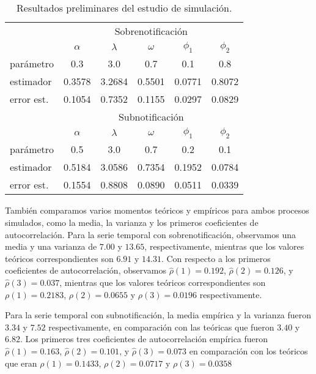 \documentclass[12pt,twoside]{article} %
\begin{document}
\begin{table}[ht]\small
\begin{center}
\caption{Resultados preliminares del estudio de simulación.\label{tab1}}
\begin{tabular}{lccccc}
\hline
& \multicolumn{5}{c}{Sobrenotificación}\\
& $\alpha$&$\lambda$&$\omega$&$\phi_1$&$\phi_2$\\
 \hline
parámetro & 0.3 & 3.0 & 0.7& 0.1& 0.8\\
estimador & 0.3578 & 3.2684 & 0.5501 & 0.0771 &0.8072 \\
error est. &  0.1054 & 0.7352 & 0.1155 & 0.0297 & 0.0829 \\
\hline \hline 
& \multicolumn{5}{c}{Subnotificación}\\
& $\alpha$&$\lambda$&$\omega$&$\phi_1$&$\phi_2$\\
 \hline
parámetro & 0.5 & 3.0 & 0.7& 0.2& 0.1\\
estimador & 0.5184 & 3.0586 &  0.7354 & 0.1952  & 0.0784 \\
error est. & 0.1554 & 0.8808 & 0.0890 & 0.0511 & 0.0339 \\
\hline 
\end{tabular}
\end{center}
\end{table}

También comparamos varios momentos teóricos y empíricos para ambos procesos simulados, como la media, la varianza y los primeros coeficientes de autocorrelación. Para la serie temporal con sobrenotificación, observamos una media y una varianza de $7.00$ y $13.65$, respectivamente, mientras que los valores teóricos correspondientes son $6.91$ y $14.31$. Con respecto a los primeros coeficientes de autocorrelación, observamos ${\hat \rho}(1) = 0.192$, ${\hat \rho}(2) = 0.126$, y ${\hat \rho}(3) = 0.037$, mientras que los valores teóricos correspondientes son $\rho(1) = 0.2183$, $\rho(2) = 0.0655$ y $\rho(3) = 0.0196$ respectivamente.

Para la serie temporal con subnotificación, la media empírica y la varianza fueron $3.34$ y $7.52$ respectivamente, en comparación con las teóricas que fueron $3.40$ y $6.82$. Los primeros tres coeficientes de autocorrelación empírica fueron ${\hat \rho}(1)=0.163$, ${\hat \rho}(2)=0.101$, y ${\hat \rho}(3 )=0.073$ en comparación con los teóricos que eran $\rho(1)=0.1433$, $\rho(2)=0.0717$ y $\rho(3)=0.0358$
\end{document}
